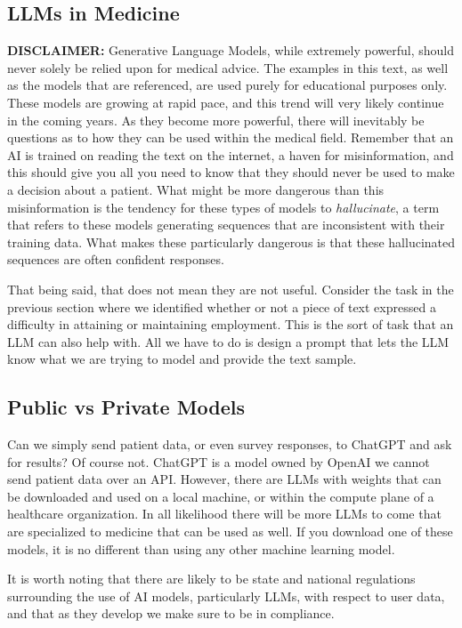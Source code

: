 \subsection{LLMs in Medicine}
\textbf{DISCLAIMER:} Generative Language Models, while extremely powerful, should never solely be relied upon for medical advice. The examples in this text,
as well as the models that are referenced, are used purely for educational purposes only.
These models are growing at rapid pace, and this trend will very likely continue in the coming years. As they become more powerful, there
will inevitably be questions as to how they can be used within the medical field. Remember that an AI is trained on reading the text on the internet,
a haven for misinformation, and this should give you all you need to know that they should never be used to make a decision about a patient. What might be more dangerous than this
misinformation is the tendency for these types of models to \textit{hallucinate}, a term that refers to these models generating sequences that are inconsistent with their training data.
What makes these particularly dangerous is that these hallucinated sequences are often confident responses.

That being said, that does not mean they are not useful. Consider the task in the previous section where we identified whether or not a piece of text
expressed a difficulty in attaining or maintaining employment. This is the sort of task that an LLM can also help with. All we have to do
is design a prompt that lets the LLM know what we are trying to model and provide the text sample.

\subsection{Public vs Private Models}

Can we simply send patient data, or even survey responses, to ChatGPT and ask for results? Of course not. ChatGPT is a model owned by OpenAI we cannot send
patient data over an API. However, there are LLMs with weights that can be downloaded and used on a local machine, or within the compute plane of a healthcare
organization. In all likelihood there will be more LLMs to come that are specialized to medicine that can be used as well. If you download one of these models,
it is no different than using any other machine learning model.

It is worth noting that there are likely to be state and national regulations surrounding the use of AI models, particularly LLMs, with respect to user data, and
that as they develop we make sure to be in compliance.

